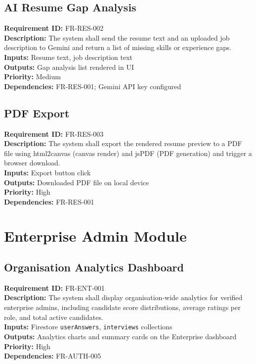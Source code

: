\documentclass{fisatinternship}
\begin{document}
\vspace{0.4cm}

\subsection{AI Resume Gap Analysis}
\textbf{Requirement ID:} FR-RES-002\\
\textbf{Description:} The system shall send the resume text and an uploaded job description
to Gemini and return a list of missing skills or experience gaps.\\
\textbf{Inputs:} Resume text, job description text\\
\textbf{Outputs:} Gap analysis list rendered in UI\\
\textbf{Priority:} Medium\\
\textbf{Dependencies:} FR-RES-001; Gemini API key configured

\vspace{0.4cm}

\subsection{PDF Export}
\textbf{Requirement ID:} FR-RES-003\\
\textbf{Description:} The system shall export the rendered resume preview to a PDF file
using html2canvas (canvas render) and jsPDF (PDF generation) and trigger a browser download.\\
\textbf{Inputs:} Export button click\\
\textbf{Outputs:} Downloaded PDF file on local device\\
\textbf{Priority:} High\\
\textbf{Dependencies:} FR-RES-001

\vspace{0.4cm}

\section{Enterprise Admin Module}

\subsection{Organisation Analytics Dashboard}
\textbf{Requirement ID:} FR-ENT-001\\
\textbf{Description:} The system shall display organisation-wide analytics for verified
enterprise admins, including candidate score distributions, average ratings per role,
and total active candidates.\\
\textbf{Inputs:} Firestore \texttt{userAnswers}, \texttt{interviews} collections\\
\textbf{Outputs:} Analytics charts and summary cards on the Enterprise dashboard\\
\textbf{Priority:} High\\
\textbf{Dependencies:} FR-AUTH-005
\end{document}
